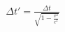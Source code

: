 \documentclass[preview]{standalone}
\begin{document}
\begin{align*}
\Delta t' = \frac{\Delta t}{\sqrt{1 - \frac{v^2}{c^2}}}
\end{align*}
\end{document}
